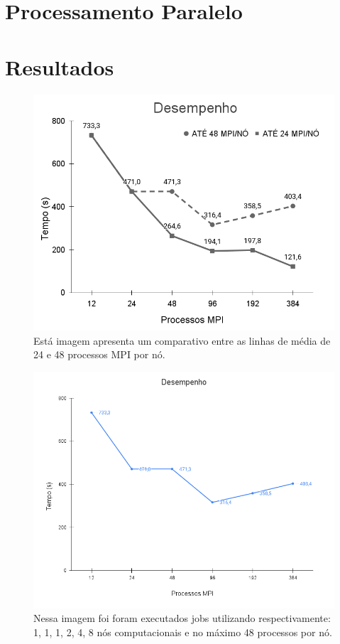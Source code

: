 \documentclass[12pt]{article}
\begin{document}
\section{Processamento Paralelo}

\section{Resultados}

\begin{figure}[ht]
\centering
\includegraphics[width=.7\textwidth]{figures/perfpernode.png}
\caption{Está imagem apresenta um comparativo entre as linhas de média de 24 e 48 processos MPI por nó.}
\label{fig:48pernode}
\end{figure}

\begin{figure}[ht]
\centering
\includegraphics[width=.7\textwidth]{figures/perfupto48pernode.png}
\caption{Nessa imagem foi foram executados jobs utilizando respectivamente: 1, 1, 1, 2, 4, 8 nós computacionais e no máximo 48 processos por nó.}
\label{fig:48MPI}
\end{figure}
\end{document}
